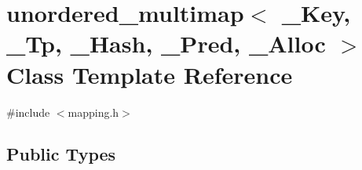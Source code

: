\hypertarget{classunordered__multimap}{}\section{unordered\+\_\+multimap$<$ \+\_\+\+Key, \+\_\+\+Tp, \+\_\+\+Hash, \+\_\+\+Pred, \+\_\+\+Alloc $>$ Class Template Reference}
\label{classunordered__multimap}


{\ttfamily \#include $<$mapping.\+h$>$}

\subsection*{Public Types}
